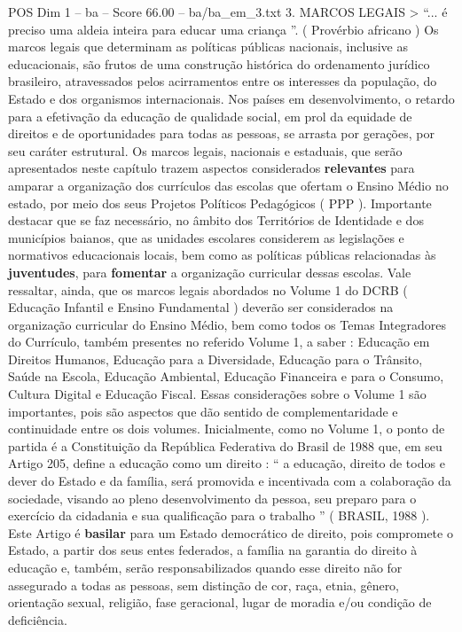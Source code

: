\begin{textsample}{POS Dim 1 – ba – Score 66.00 – ba/ba\_em\_3.txt}  \label{ex:f1_pos_103}
3.
MARCOS LEGAIS > “... é preciso uma aldeia inteira para educar uma criança ”. ( Provérbio africano ) Os marcos legais que determinam as políticas públicas nacionais, inclusive as educacionais, são frutos de uma construção histórica do ordenamento jurídico brasileiro, atravessados pelos acirramentos entre os interesses da população, do Estado e dos organismos internacionais.
Nos países em desenvolvimento, o retardo para a efetivação da educação de qualidade social, em prol da equidade de direitos e de oportunidades para todas as pessoas, se arrasta por gerações, por seu caráter estrutural.
Os marcos legais, nacionais e estaduais, que serão apresentados neste capítulo trazem aspectos considerados \textbf{relevantes} para amparar a organização dos currículos das escolas que ofertam o Ensino Médio no estado, por meio dos seus Projetos Políticos Pedagógicos ( PPP ).
Importante destacar que se faz necessário, no âmbito dos Territórios de Identidade e dos municípios baianos, que as unidades escolares considerem as legislações e normativos educacionais locais, bem como as políticas públicas relacionadas às \textbf{juventudes}, para \textbf{fomentar} a organização curricular dessas escolas.
Vale ressaltar, ainda, que os marcos legais abordados no Volume 1 do DCRB ( Educação Infantil e Ensino Fundamental ) deverão ser considerados na organização curricular do Ensino Médio, bem como todos os Temas Integradores do Currículo, também presentes no referido Volume 1, a saber : Educação em Direitos Humanos, Educação para a Diversidade, Educação para o Trânsito, Saúde na Escola, Educação Ambiental, Educação Financeira e para o Consumo, Cultura Digital e Educação Fiscal.
Essas considerações sobre o Volume 1 são importantes, pois são aspectos que dão sentido de complementaridade e continuidade entre os dois volumes.
Inicialmente, como no Volume 1, o ponto de partida é a Constituição da República Federativa do Brasil de 1988 que, em seu Artigo 205, define a educação como um direito : “ a educação, direito de todos e dever do Estado e da família, será promovida e incentivada com a colaboração da sociedade, visando ao pleno desenvolvimento da pessoa, seu preparo para o exercício da cidadania e sua qualificação para o trabalho ” ( BRASIL, 1988 ).
Este Artigo é \textbf{basilar} para um Estado democrático de direito, pois compromete o Estado, a partir dos seus entes federados, a família na garantia do direito à educação e, também, serão responsabilizados quando esse direito não for assegurado a todas as pessoas, sem distinção de cor, raça, etnia, gênero, orientação sexual, religião, fase geracional, lugar de moradia e/ou condição de deficiência.

\end{textsample}
